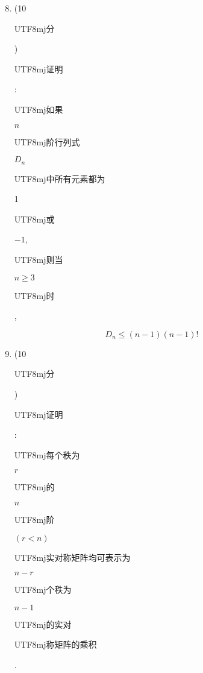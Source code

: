 \documentclass[10pt]{article}
\begin{document}
\begin{enumerate}
  \setcounter{enumi}{7}
  \item (10 \begin{CJK}{UTF8}{mj}分\end{CJK}) \begin{CJK}{UTF8}{mj}证明\end{CJK}: \begin{CJK}{UTF8}{mj}如果\end{CJK} $n$ \begin{CJK}{UTF8}{mj}阶行列式\end{CJK} $D_{n}$ \begin{CJK}{UTF8}{mj}中所有元素都为\end{CJK} 1 \begin{CJK}{UTF8}{mj}或\end{CJK} $-1$, \begin{CJK}{UTF8}{mj}则当\end{CJK} $n \geqslant 3$ \begin{CJK}{UTF8}{mj}时\end{CJK},
\end{enumerate}
$$
D_{n} \leqslant(n-1)(n-1) !
$$

\begin{enumerate}
  \setcounter{enumi}{8}
  \item (10 \begin{CJK}{UTF8}{mj}分\end{CJK}) \begin{CJK}{UTF8}{mj}证明\end{CJK}: \begin{CJK}{UTF8}{mj}每个秩为\end{CJK} $r$ \begin{CJK}{UTF8}{mj}的\end{CJK} $n$ \begin{CJK}{UTF8}{mj}阶\end{CJK} $(r<n)$ \begin{CJK}{UTF8}{mj}实对称矩阵均可表示为\end{CJK} $n-r$ \begin{CJK}{UTF8}{mj}个秩为\end{CJK} $n-1$ \begin{CJK}{UTF8}{mj}的实对\end{CJK} \begin{CJK}{UTF8}{mj}称矩阵的乘积\end{CJK}.
\end{enumerate}
\end{document}
